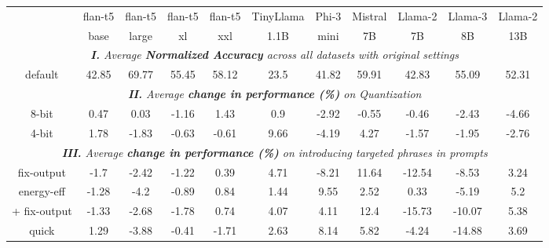 
\begin{table*}[!t]
    \begin{center}
    \footnotesize
    
        \begin{tabular}{|c||c|c|c|c||c|c|c|c|c|c|}
        \hline
        \ & flan-t5 & flan-t5 & flan-t5 & flan-t5 & TinyLlama & Phi-3 & Mistral & Llama-2 &  Llama-3 & Llama-2 \\
                                & base    & large    & xl      & xxl    & 1.1B      & mini  & 7B      & 7B      & 8B & 13B\\
        \hline \hline
        \multicolumn{11}{|c|}{\it \textbf{I.} Average \textbf{Normalized Accuracy} across all datasets with original settings} \\
        \hline
        default & 42.85 & 69.77 & 55.45 & 58.12 & 23.5 & 41.82 & 59.91 & 42.83 & 55.09 & 52.31\\ 
        \hline \hline

        \multicolumn{11}{|c|}{\it \textbf{II.} Average \textbf{change in performance (\%)} on Quantization} \\
        \hline
        8-bit  & 0.47 & 0.03 & -1.16 & 1.43 & 0.9 & -2.92 & -0.55 & -0.46 & -2.43 & -4.66 \\  
        4-bit  & 1.78 & -1.83 & -0.63 & -0.61 & 9.66 & -4.19 & 4.27 & -1.57 & -1.95 & -2.76\\ 
        \hline \hline
        
        \multicolumn{11}{|c|}{\it \textbf{III.} Average \textbf{change in performance (\%)} on introducing targeted phrases in prompts} \\
        \hline
        fix-output & -1.7 & -2.42 & -1.22 & 0.39 & 4.71 & -8.21 & 11.64 & -12.54 & -8.53 & 3.24\\
        \hline
        
        energy-eff & -1.28 & -4.2 & -0.89 & 0.84 & 1.44 & 9.55 & 2.52 & 0.33 & -5.19 & 5.2\\
        
         + fix-output & -1.33 & -2.68 & -1.78 & 0.74 & 4.07 & 4.11 & 12.4 & -15.73 & -10.07 & 5.38\\
        \hline
        quick & 1.29 & -3.88 & -0.41 & -1.71 & 2.63 & 8.14 & 5.82 & -4.24 & -14.88 & 3.69\\
        

\end{tabular}
\end{center}
\end{table*}
